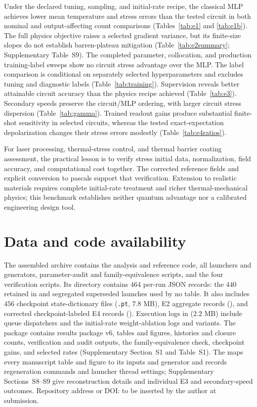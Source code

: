 \documentclass[11pt]{article}
\begin{document}
Under the declared tuning, sampling, and initial-rate recipe, the classical
MLP achieves lower mean temperature and stress errors than the tested
circuit in both nominal and output-affecting count comparisons
(Tables~\ref{tab:e1} and \ref{tab:e1b}). The full physics objective raises
a selected gradient variance, but its finite-size slopes do not establish
barren-plateau mitigation (Table~\ref{tab:e2summary}; Supplementary Table~S9).
The completed parameter, collocation, and production training-label
sweeps show no circuit stress advantage over the MLP. The label comparison
is conditional on separately selected hyperparameters and excludes tuning
and diagnostic labels (Table~\ref{tab:training}). Supervision reveals better attainable circuit accuracy
than the physics recipe achieved (Table~\ref{tab:e3}). Secondary speeds
preserve the circuit/MLP ordering, with larger circuit stress dispersion
(Table~\ref{tab:gamma}). Trained readout gains
produce substantial finite-shot sensitivity in selected circuits, whereas
the tested exact-expectation depolarization changes their stress errors
modestly (Table~\ref{tab:e4ratios}).

For laser processing, thermal-stress control, and thermal barrier coating
assessment, the practical lesson is to verify stress initial data,
normalization, field accuracy, and computational cost together. The
corrected reference fields and explicit conversion to pascals support
that verification. Extension to realistic materials requires complete
initial-rate treatment and richer thermal-mechanical physics; this
benchmark establishes neither quantum advantage nor a calibrated
engineering design tool.

\section*{Data and code availability}
The assembled archive 
contains the analysis and reference code, all launchers and generators,
parameter-audit and family-equivalence scripts, and the four verification
scripts. Its  directory contains $464$ per-run JSON records:
the $440$ retained in  and segregated superseded
launches used by no table. It also includes $456$ checkpoint state-dictionary
files (\texttt{.pt}, $7.8$ MB), E2 aggregate records
(), and corrected checkpoint-labeled E4 records
(). Execution logs in  ($2.2$ MB)
include queue dispatchers and the initial-rate weight-ablation logs and
variants. The package contains results package v6, tables and figures,
histories and closure counts, verification and audit outputs, the
family-equivalence check, checkpoint gains, and selected rates
(Supplementary Section~S1 and Table~S1). The 
maps every manuscript table and figure to its inputs and generator and
records regeneration commands and launcher thread settings; Supplementary
Sections~S8--S9 give reconstruction details and individual E3 and
secondary-speed outcomes. Repository address or DOI: to be inserted by
the author at submission.
\end{document}
